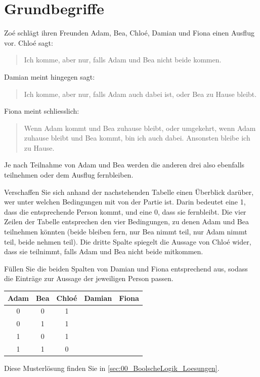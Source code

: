 \section{Grundbegriffe}
\begin{myexercise}[Einstiegsaufgabe]\label{myexercise:EinstiegLogik}
    Zoé schlägt ihren Freunden Adam, Bea, Chloé, Damian und Fiona einen Ausflug vor. Chloé sagt:
    \begin{quote}
    Ich komme, aber nur, falls Adam und Bea nicht beide kommen.
    \end{quote}

    Damian meint hingegen sagt:
    \begin{quote}
    Ich komme, aber nur, falls Adam auch dabei ist, oder Bea zu Hause bleibt.
    \end{quote}
    Fiona meint schliesslich:
    \begin{quote}
    Wenn Adam kommt und Bea zuhause bleibt, oder umgekehrt, wenn Adam zuhause bleibt und Bea kommt, bin ich auch dabei. Ansonsten bleibe ich zu Hause.
    \end{quote}

    Je nach Teilnahme von Adam und Bea werden die anderen drei also ebenfalls teilnehmen oder dem Ausflug fernbleiben. 
    
    Verschaffen Sie sich anhand der nachstehenden Tabelle einen Überblick darüber, wer unter welchen Bedingungen mit von der Partie ist. Darin bedeutet eine 1, dass die entsprechende Person kommt, und eine $0$, dass sie fernbleibt. Die vier Zeilen der Tabelle entsprechen den vier Bedingungen, zu denen Adam und Bea teilnehmen könnten (beide bleiben fern, nur Bea nimmt teil, nur Adam nimmt teil, beide nehmen teil). Die dritte Spalte spiegelt die Aussage von Chloé wider, dass sie teilnimmt, falls Adam und Bea nicht beide mitkommen.

    Füllen Sie die beiden Spalten von Damian und Fiona entsprechend aus, sodass die Einträge zur Aussage der jeweiligen Person passen.
        \begin{center}
            \begin{tabular}{ |c|c||c|c|c| } 
             \hline
             Adam & Bea & Chloé & Damian & Fiona \\ 
             \hline
             0 & 0 & 1 & & \\ 
             0 & 1 & 1 & & \\
             1 & 0 & 1 & & \\
             1 & 1 & 0 & & \\ 
             \hline
            \end{tabular}
        \end{center}
    \begin{myanswer}
        Diese Musterlösung finden Sie in \cref{sec:00_BoolscheLogik_Loesungen}.
    \end{myanswer}
\end{myexercise}
 
